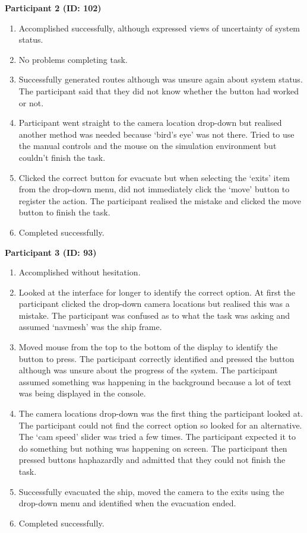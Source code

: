 \textbf{Participant 2 (ID: 102)}
\begin{enumerate}
\item Accomplished successfully, although expressed views of uncertainty of system status.
\item No problems completing task.
\item Successfully generated routes although was unsure again about system status. The participant said that they did not know whether the button had worked or not.
\item Participant went straight to the camera location drop-down but realised another method was needed because `bird's eye' was not there. Tried to use the manual controls and the mouse on the simulation environment but couldn’t finish the task.
\item Clicked the correct button for evacuate but when selecting the ‘exits’ item from the drop-down menu, did not immediately click the ‘move’ button to register the action. The participant realised the mistake and clicked the move button to finish the task.
\item Completed successfully.
\end{enumerate}

\textbf{Participant 3 (ID: 93)}
\begin{enumerate}
\item Accomplished without hesitation.
\item Looked at the interface for longer to identify the correct option. At first the participant clicked the drop-down camera locations but realised this was a mistake. The participant was confused as to what the task was asking and assumed ‘navmesh’ was the ship frame.
\item Moved mouse from the top to the bottom of the display to identify the button to press. The participant correctly identified and pressed the button although was unsure about the progress of the system. The participant assumed something was happening in the background because a lot of text was being displayed in the console.
\item The camera locations drop-down was the first thing the participant looked at. The participant could not find the correct option so looked for an alternative. The ‘cam speed’ slider was tried a few times. The participant expected it to do something but nothing was happening on screen. The participant then pressed buttons haphazardly and admitted that they could not finish the task.
\item Successfully evacuated the ship, moved the camera to the exits using the drop-down menu and identified when the evacuation ended.
\item Completed successfully.
\end{enumerate}

